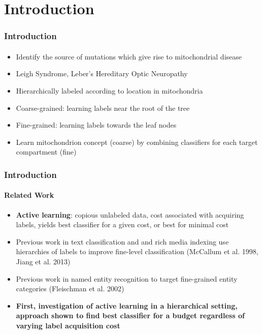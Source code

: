 \documentclass{beamer}
\begin{document}
\section{Introduction}
\begin{frame}
    \frametitle{Introduction}   %
    \framesubtitle{}
    \begin{itemize}
      \item Identify the source of mutations which give rise to mitochondrial disease
      \item Leigh Syndrome, Leber’s Hereditary Optic Neuropathy %
      \item Hierarchically labeled according to location in mitochondria
      \item Coarse-grained: learning labels near the root of the tree
      \item Fine-grained: learning labels towards the leaf nodes
      \item Learn mitochondrion concept (coarse) by combining classifiers for each target compartment (fine)
    \end{itemize}
\end{frame}
\begin{frame}
    \frametitle{Introduction}     %
    \framesubtitle{Related Work}
    \begin{itemize}
      \item \textbf{Active learning}: copious unlabeled data, cost associated with acquiring labels,
      yields best classifier for a given cost, or best for minimal cost
      \item Previous work in text classification and and rich media indexing use hierarchies of
      labels to improve fine-level classification (McCallum et al. 1998, Jiang et al. 2013)
      \item Previous work in named entity recognition to target fine-grained entity categories (Fleischman et al. 2002)
      \item \textbf{First, investigation of active learning in a hierarchical setting, approach
      shown to find best classifier for a budget regardless of varying label acquisition cost}
    \end{itemize}
\end{frame}
\end{document}
